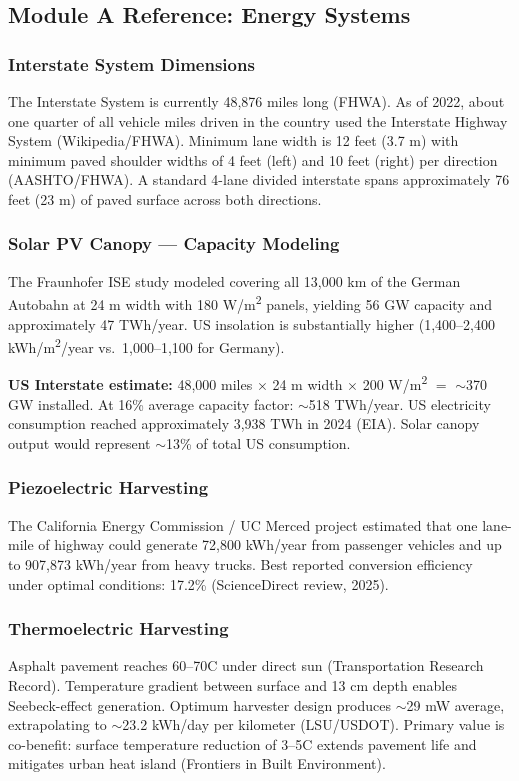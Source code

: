 \documentclass[11pt,letterpaper]{article}
\begin{document}
\subsection{Module A Reference: Energy Systems}

\subsubsection{Interstate System Dimensions}
The Interstate System is currently 48,876 miles long (FHWA). As of 2022, about one quarter of all vehicle miles driven in the country used the Interstate Highway System (Wikipedia/FHWA). Minimum lane width is 12 feet (3.7 m) with minimum paved shoulder widths of 4 feet (left) and 10 feet (right) per direction (AASHTO/FHWA). A standard 4-lane divided interstate spans approximately 76 feet (23 m) of paved surface across both directions.

\subsubsection{Solar PV Canopy --- Capacity Modeling}
The Fraunhofer ISE study modeled covering all 13,000 km of the German Autobahn at 24 m width with 180 W/m\textsuperscript{2} panels, yielding 56 GW capacity and approximately 47 TWh/year. US insolation is substantially higher (1,400--2,400 kWh/m\textsuperscript{2}/year vs.\ 1,000--1,100 for Germany).

\textbf{US Interstate estimate:} 48,000 miles $\times$ 24 m width $\times$ 200 W/m\textsuperscript{2} $=$ $\sim$370 GW installed. At 16\% average capacity factor: $\sim$518 TWh/year. US electricity consumption reached approximately 3,938 TWh in 2024 (EIA). Solar canopy output would represent $\sim$13\% of total US consumption.

\subsubsection{Piezoelectric Harvesting}
The California Energy Commission / UC Merced project estimated that one lane-mile of highway could generate 72,800 kWh/year from passenger vehicles and up to 907,873 kWh/year from heavy trucks. Best reported conversion efficiency under optimal conditions: 17.2\% (ScienceDirect review, 2025).

\subsubsection{Thermoelectric Harvesting}
Asphalt pavement reaches 60--70\textdegree C under direct sun (Transportation Research Record). Temperature gradient between surface and 13 cm depth enables Seebeck-effect generation. Optimum harvester design produces $\sim$29 mW average, extrapolating to $\sim$23.2 kWh/day per kilometer (LSU/USDOT). Primary value is co-benefit: surface temperature reduction of 3--5\textdegree C extends pavement life and mitigates urban heat island (Frontiers in Built Environment).
\end{document}
